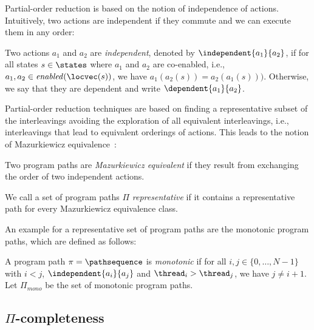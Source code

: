 \documentclass[conference]{IEEEtran}
\begin{document}
Partial-order reduction is based on the notion of independence of actions. 
Intuitively, two actions are independent if they commute and we can execute
them in any order:
%
\begin{center}
  \begin{define}[Independence]
    Two actions $a_1$ and $a_2$ are \emph{independent}, denoted by
    $\independent{a_1}{a_2}$, if for all states $s \in \states$ where $a_1$ and
    $a_2$ are co-enabled, i.e., $a_1, a_2\in \mathit{enabled}(\locvec(s))$, we have
    \mbox{$a_1(a_2(s)) = a_2(a_1(s)))$}.  Otherwise, we say that they are
    dependent and write $\dependent{a_1}{a_2}$.
  \end{define}
\end{center}
%
Partial-order reduction techniques are based on finding a representative
subset of the interleavings avoiding the exploration of all equivalent interleavings,
i.e., interleavings that lead to equivalent orderings of actions.
This leads to the notion of Mazurkiewicz equivalence~\cite{DBLP:conf/ac/Mazurkiewicz86}:
%
\begin{center}
  \begin{define}
  Two program paths are \emph{Mazurkiewicz equivalent} if they result
  from exchanging the order of two independent actions.

  We call a set of program paths $\Pi$ \emph{representative} if it contains
  a representative path for every Mazurkiewicz equivalence class. 
  \end{define}

\end{center}

An example for a representative set of program paths
are the monotonic program paths, which are defined as follows:

\begin{center}
  \begin{define}
  A program path $\pi = \pathsequence$ is \emph{monotonic} if
  for all $i,j\in\{0,\ldots,N-1\}$ with $i<j$,
  $\independent{a_i}{a_j}$ and  $\thread_i > \thread_j$,
  we have  $j\neq i+1$.
  Let $\Pi_{mono}$ be the set of monotonic program paths.
  \end{define}
\end{center}

\subsection{\texorpdfstring{$\Pi$-completeness}{Pi-completeness}}
\end{document}
